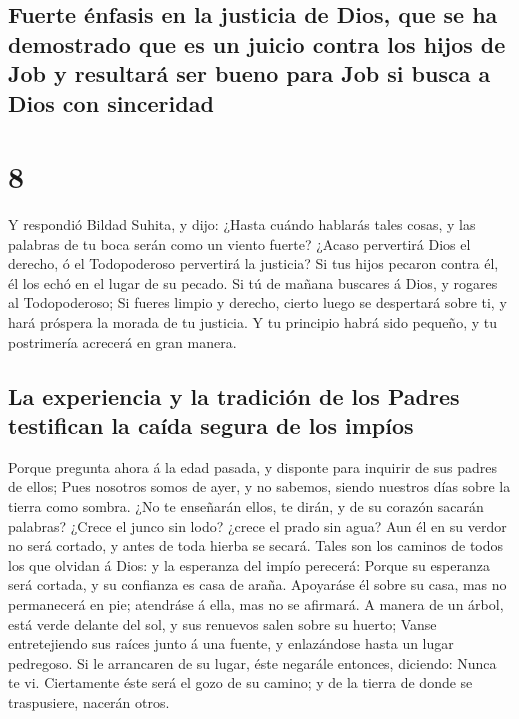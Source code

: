 \hypertarget{fuerte-uxe9nfasis-en-la-justicia-de-dios-que-se-ha-demostrado-que-es-un-juicio-contra-los-hijos-de-job-y-resultaruxe1-ser-bueno-para-job-si-busca-a-dios-con-sinceridad}{%
\subsection{Fuerte énfasis en la justicia de Dios, que se ha demostrado
que es un juicio contra los hijos de Job y resultará ser bueno para Job
si busca a Dios con
sinceridad}\label{fuerte-uxe9nfasis-en-la-justicia-de-dios-que-se-ha-demostrado-que-es-un-juicio-contra-los-hijos-de-job-y-resultaruxe1-ser-bueno-para-job-si-busca-a-dios-con-sinceridad}}

\hypertarget{section-7}{%
\section{8}\label{section-7}}

 Y respondió Bildad Suhita, y dijo:  ¿Hasta
cuándo hablarás tales cosas, y las palabras de tu boca serán como un
viento fuerte?  ¿Acaso pervertirá Dios el derecho, ó el
Todopoderoso pervertirá la justicia?  Si tus hijos pecaron
contra él, él los echó en el lugar de su pecado.  Si tú de
mañana buscares á Dios, y rogares al Todopoderoso;  Si
fueres limpio y derecho, cierto luego se despertará sobre ti, y hará
próspera la morada de tu justicia.  Y tu principio habrá
sido pequeño, y tu postrimería acrecerá en gran manera.

\hypertarget{la-experiencia-y-la-tradiciuxf3n-de-los-padres-testifican-la-cauxedda-segura-de-los-impuxedos}{%
\subsection{La experiencia y la tradición de los Padres testifican la
caída segura de los
impíos}\label{la-experiencia-y-la-tradiciuxf3n-de-los-padres-testifican-la-cauxedda-segura-de-los-impuxedos}}

 Porque pregunta ahora á la edad pasada, y disponte para
inquirir de sus padres de ellos;  Pues nosotros somos de
ayer, y no sabemos, siendo nuestros días sobre la tierra como sombra.
 ¿No te enseñarán ellos, te dirán, y de su corazón
sacarán palabras?  ¿Crece el junco sin lodo? ¿crece el
prado sin agua?  Aun él en su verdor no será cortado, y
antes de toda hierba se secará.  Tales son los caminos de
todos los que olvidan á Dios: y la esperanza del impío perecerá:
 Porque su esperanza será cortada, y su confianza es casa
de araña.  Apoyaráse él sobre su casa, mas no permanecerá
en pie; atendráse á ella, mas no se afirmará.  A manera
de un árbol, está verde delante del sol, y sus renuevos salen sobre su
huerto;  Vanse entretejiendo sus raíces junto á una
fuente, y enlazándose hasta un lugar pedregoso.  Si le
arrancaren de su lugar, éste negarále entonces, diciendo: Nunca te vi.
 Ciertamente éste será el gozo de su camino; y de la
tierra de donde se traspusiere, nacerán otros.

